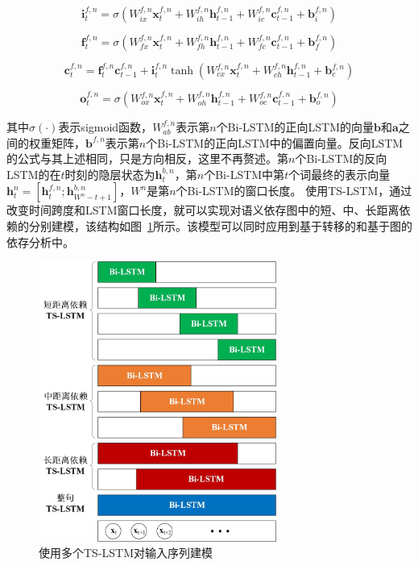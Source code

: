 \begin{equation}
\mathbf{i}^{f,n}_t = \sigma(W^{f,n}_{ix} \mathbf{x}^{f,n}_t + W^{f,n}_{ih} \mathbf{h}^{f,n}_{t-1} + W^{f,n}_{ic} \mathbf{c}^{f,n}_{t-1} + \mathbf{b}^{f,n}_i)
\end{equation}

\begin{equation}
\mathbf{f}^{f,n}_t = \sigma(W^{f,n}_{fx} \mathbf{x}^{f,n}_t + W^{f,n}_{fh} \mathbf{h}^{f,n}_{t-1} + W^{f,n}_{fc} \mathbf{c}^{f,n}_{t-1} + \mathbf{b}^{f,n}_f)
\end{equation}

\begin{equation}
\mathbf{c}^{f,n}_t = \mathbf{f}^{f,n}_t \mathbf{c}^{f,n}_{t-1} + \mathbf{i}^{f,n}_t \tanh(W^{f,n}_{cx}\mathbf{x}^{f,n}_t + W^{f,n}_{ch}\mathbf{h}^{f,n}_{t-1} + \mathbf{b}^{f,n}_c)
\end{equation}

\begin{equation}
\mathbf{o}^{f,n}_t = \sigma(W^{f,n}_{ox} \mathbf{x}^{f,n}_t + W^{f,n}_{oh} \mathbf{h}^{f,n}_{t-1} + W^{f,n}_{oc} \mathbf{c}^{f,n}_{t-1} + \mathbf{b}^{f,n}_o)
\end{equation}

其中$\sigma(\cdot)$表示sigmoid函数，$W^{f,n}_{ab}$表示第$n$个Bi-LSTM的正向LSTM的向量$\mathbf{b}$和$\mathbf{a}$之间的权重矩阵，$\mathbf{b}^{f,n}$表示第$n$个Bi-LSTM的正向LSTM中的偏置向量。反向LSTM的公式与其上述相同，只是方向相反，这里不再赘述。第$n$个Bi-LSTM的反向LSTM的在$t$时刻的隐层状态为$\mathbf{h}^{b,n}_t$，第$n$个Bi-LSTM中第$t$个词最终的表示向量$\mathbf{h}^n_t = [\mathbf{h}^{f,n}_t;\mathbf{h}^{b,n}_{W^n-t+1}]$，$W^n$是第$n$个Bi-LSTM的窗口长度。
使用TS-LSTM，通过改变时间跨度和LSTM窗口长度，就可以实现对语义依存图中的短、中、长距离依赖的分别建模，该结构如图~\ref{fig:multi-ts-lstm}所示。该模型可以同时应用到基于转移的和基于图的依存分析中。

\begin{figure}[hbtp]
	\centering
	\includegraphics[width=78mm]{picture/multi-ts-lstm.jpg}
	\caption{使用多个TS-LSTM对输入序列建模}
	\label{fig:multi-ts-lstm}
\end{figure}

